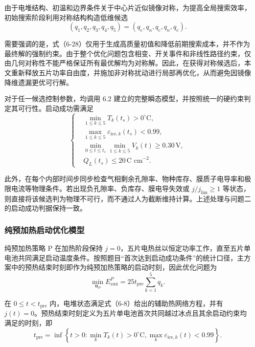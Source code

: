 \documentclass[bwprint]{gmcmthesis}
\numberwithin{figure}{section}
\begin{document}
\noindent 由于电堆结构、初温和边界条件关于中心片近似镜像对称，为提高全局搜索效率，初始搜索阶段利用对称结构构造低维候选
\begin{equation}
(q_1, q_2, q_3, q_4, q_5) = (q_e, q_n, q_c, q_n, q_e). \tag{6-28}
\end{equation}

\noindent 需要强调的是，式（6-28）仅用于生成高质量初值和降低前期搜索成本，并不作为最终解的强制约束。由于整个优化问题包含相变、开关事件和非线性路径约束，仅由几何对称性不能严格保证所有最优解均为对称解。因此，在获得对称候选后，本文重新释放五片功率自由度，并施加非对称扰动进行局部再优化，从而避免因镜像降维遗漏更优可行解。

\noindent 对于任一候选控制参数，均调用 6.2 建立的完整瞬态模型，并按照统一的硬约束判定其可行性。启动成功需满足
\begin{equation}
\left\{
\begin{aligned}
& \min_{1 \leq k \leq 5} T_k(t_s) > 0^\circ\text{C}, \\
& \max_{1 \leq k \leq 5} \varepsilon_{\text{ice},k}(t_s) < 0.99, \\
& \min_{0 \leq t \leq t_s} \min_{1 \leq k \leq 5} V_k(t) \geq 0.30 \, \text{V}, \\
& Q_L(t_s) \leq 20 \, \text{C cm}^{-2}.
\end{aligned}
\right.
\tag{6-29}
\end{equation}

\noindent 此外，在每个内部时间步同步检查气相剩余孔隙率、物种库存、膜质子电导率和极限电流等物理条件。若出现负孔隙率、负库存、膜电导失效或 \(j/j_{\lim}\ge1\) 等状态，则直接将该候选判为物理不可行，而不通过人为截断维持计算。上述处理与问题二的启动成功判据保持一致。
\subsubsection{纯预加热启动优化模型}

\noindent 纯预加热策略 P 在加热阶段保持 \(j = 0\)，五片电热丝以恒定功率工作，直至五片单电池共同满足启动温度条件。按照题目“首次达到启动成功条件”的统计口径，主方案中的预热结束时刻即作为纯预加热策略的启动时刻，因此优化问题为
\begin{equation}
\min_{\boldsymbol{u}_P} E_{\text{aux}}^P = 25 t_{\text{pre}} \sum_{k=1}^5 q_k. \tag{6-30}
\end{equation}

\noindent 在 \(0 \leq t < t_{\text{pre}}\) 内，电堆状态满足式（6-8）给出的辅助热网络方程，并有 \(j(t) = 0\)。预热结束时刻定义为五片单电池首次共同越过冰点且其余启动约束均满足的时刻，即
\begin{equation}
t_{\text{pre}} = \inf \left\{ t > 0 : \min_k T_k(t) > 0^\circ\text{C}, \max_k \varepsilon_{\text{ice},k}(t) < 0.99 \right\}. \tag{6-31}
\end{equation}
\end{document}
